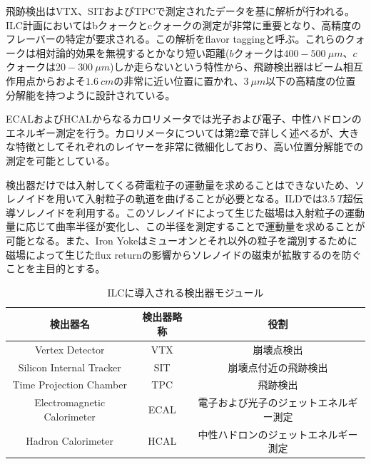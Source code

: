 飛跡検出はVTX、SITおよびTPCで測定されたデータを基に解析が行われる。ILC計画においてはbクォークとcクォークの測定が非常に重要となり、高精度のフレーバーの特定が要求される。この解析をflavor taggingと呼ぶ。これらのクォークは相対論的効果を無視するとかなり短い距離($b$クォークは$400-\SI{500}{\mu m}$、$c$クォークは$20-\SI{300}{\mu m}$)しか走らないという特性から、飛跡検出器はビーム相互作用点からおよそ$\SI{1.6}{cm}$の非常に近い位置に置かれ、$\SI{3}{\mu m}$以下の高精度の位置分解能を持つように設計されている。

ECALおよびHCALからなるカロリメータでは光子および電子、中性ハドロンのエネルギー測定を行う。カロリメータについては第2章で詳しく述べるが、大きな特徴としてそれぞれのレイヤーを非常に微細化しており、高い位置分解能での測定を可能としている。

検出器だけでは入射してくる荷電粒子の運動量を求めることはできないため、ソレノイドを用いて入射粒子の軌道を曲げることが必要となる。ILDでは$\SI{3.5}{T}$超伝導ソレノイドを利用する。このソレノイドによって生じた磁場は入射粒子の運動量に応じて曲率半径が変化し、この半径を測定することで運動量を求めることが可能となる。また、Iron Yokeはミューオンとそれ以外の粒子を識別するために磁場によって生じたflux returnの影響からソレノイドの磁束が拡散するのを防ぐことを主目的とする。



\begin{table}[h]
	\begin{center}
		\begin{tabular}{c|c|c}
		\hline
		検出器名&検出器略称&役割\\\hline\hline
		Vertex Detector&VTX&崩壊点検出\\
		Silicon Internal Tracker&SIT&崩壊点付近の飛跡検出\\
		Time Projection Chamber&TPC&飛跡検出\\
		Electromagnetic Calorimeter& ECAL&電子および光子のジェットエネルギー測定\\
		Hadron Calorimeter&HCAL&中性ハドロンのジェットエネルギー測定\\\hline
		\end{tabular}
	\end{center}
	\caption[ILDに導入される検出器モジュール]{ILCに導入される検出器モジュール}
\label{Detector}
\end{table}


